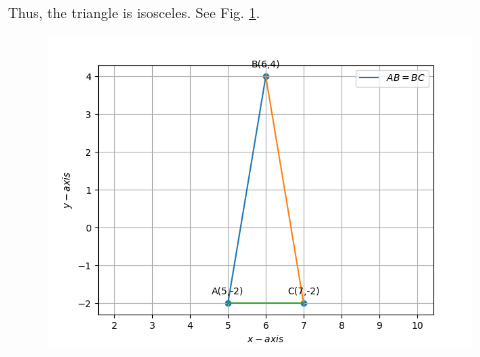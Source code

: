 \documentclass[12pt]{article}
\begin{document}
	Thus, the triangle is isosceles.  See Fig. 
\ref{fig:chapters/10/7/1/4/Fig}.
\begin{figure}[!h]
	\begin{center} 
	    \includegraphics[width=\columnwidth]{chapters/10/7/1/4/figs/Vector2.png}
	\end{center}
\caption{}
\label{fig:chapters/10/7/1/4/Fig}
\end{figure}
\end{document}
